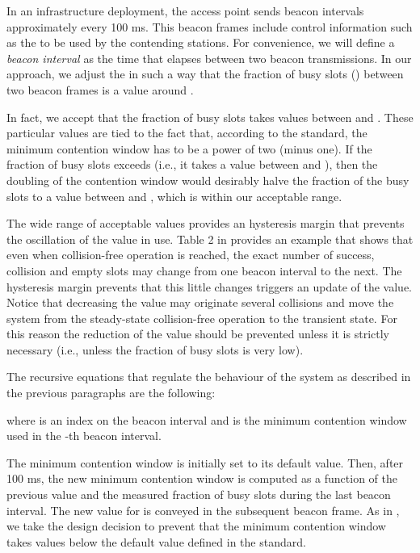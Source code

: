 \documentclass[journal]{IEEEtran}
\begin{document}
In an infrastructure deployment, the access point sends beacon intervals approximately every 100 ms. This beacon frames include control information such as the  to be used by the contending stations. For convenience, we will define a \emph{beacon interval} as the time that elapses between two beacon transmissions. In our approach, we adjust the  in such a way that the fraction of busy slots () between two beacon frames is a value around . 

In fact, we accept that the fraction of busy slots takes values between  and . These particular values are tied to the fact that, according to the standard, the minimum contention window has to be a power of two (minus one). If the fraction of busy slots exceeds  (i.e., it takes a value between  and ), then the doubling of the contention window would desirably halve the fraction of the busy slots to a value between  and , which is within our acceptable range.

 The wide range of acceptable values provides an hysteresis margin that prevents the oscillation of the  value in use. Table 2 in \cite{barcelo2010dpa} provides an example that shows that even when collision-free operation is reached, the exact number of success, collision and empty slots may change from one beacon interval to the next. The hysteresis margin prevents that this little changes triggers an update of the  value. Notice that decreasing the  value may originate several collisions and move the system from the steady-state collision-free operation to the transient state. For this reason the reduction of the  value should be prevented unless it is strictly necessary (i.e., unless the fraction of busy slots is very low). 

The recursive equations that regulate the behaviour of the system as described in the previous paragraphs are the following:

where  is an index on the beacon interval and  is the minimum contention window used in the -th beacon interval.

The minimum contention window is initially set to its default value. Then, after 100 ms, the  new minimum contention window is computed as a function of the previous value and the measured fraction of busy slots during the last beacon interval. The new value for  is conveyed in the subsequent beacon frame. As in \cite{patras2009cta}, we take the design decision to prevent that the minimum contention window takes values below the default value defined in the standard.
\end{document}
